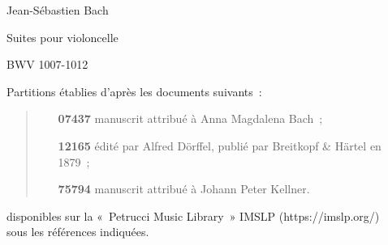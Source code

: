 \documentclass[a4paper,twoside]{article}
\begin{document}
\cleardoublepage
  \vspace*{\fill}
  \begin{center}
	\LARGE
	Jean-Sébastien Bach
	
	\bigskip
	
	\Huge
	Suites pour violoncelle
	
	\bigskip
	
	\Large
	BWV 1007-1012
	
	
	\vspace*{\fill}

	\hspace*{1.8cm}\parbox{0.7\textwidth}{%
	\large
	Partitions établies d'après les documents suivants~:
	\quad\begin{quote}
	\begin{itemize}
	  \item[\textbf{07437}] manuscrit attribué à Anna Magdalena Bach~;

	  \item[\textbf{12165}] édité par Alfred Dörffel, publié par Breitkopf \& Härtel en 1879~;

	  \item[\textbf{75794}] manuscrit attribué à Johann Peter Kellner.
	\end{itemize}
	\end{quote}
	disponibles sur la «~Petrucci Music Library~» IMSLP (\textsf{https://imslp.org/}) \\
	sous les références indiquées.
  }

  \end{center}

  \vspace*{\fill}

\newpage
\restoregeometry

\vspace*{10cm}
\end{document}
